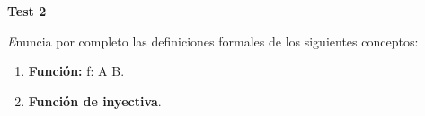 \documentclass[12pt]{article}
\begin{document}
\begin{center}
\Large{\textbf{Test 2}}

\textit Enuncia por completo las definiciones formales de los siguientes conceptos:
\begin{enumerate}
\item \textbf{Funci\'on:} f: A \rightarrow B.
\item \textbf{Funci\'on de inyectiva}.
\end{enumerate}





\end{center}
\end{document}

